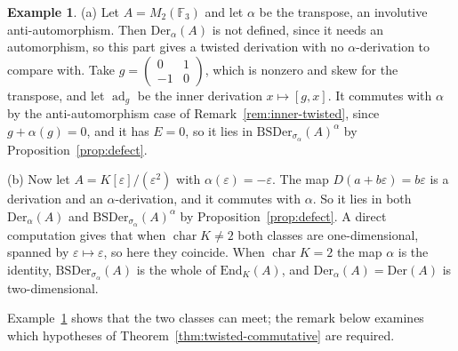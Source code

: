 \documentclass[]{interact}
\theoremstyle{plain}
\theoremstyle{definition}
\newtheorem{example}[theorem]{Example}
\theoremstyle{remark}
\newcommand{\Der}{\mathrm{Der}}
\newcommand{\BSDer}{\mathrm{BSDer}}
\newcommand{\ADer}{\mathrm{Der}_\alpha}
\begin{document}
\begin{example}\label{ex:twisted-meet}
(a) Let $A = M_2(\mathbb{F}_3)$ and let $\alpha$ be the transpose, an involutive anti-automorphism.
Then $\ADer(A)$ is not defined, since it needs an automorphism, so this part gives a twisted derivation with no $\alpha$-derivation to compare with.
Take $g = \begin{pmatrix} 0 & 1 \\ -1 & 0 \end{pmatrix}$, which is nonzero and skew for the transpose, and let $\operatorname{ad}_g$ be the inner derivation $x \mapsto [g,x]$.
It commutes with $\alpha$ by the anti-automorphism case of Remark~\ref{rem:inner-twisted}, since $g + \alpha(g) = 0$, and it has $E = 0$, so it lies in $\BSDer_{\sigma_\alpha}(A)^\alpha$ by Proposition~\ref{prop:defect}.

(b) Now let $A = K[\varepsilon]/(\varepsilon^2)$ with $\alpha(\varepsilon) = -\varepsilon$.
The map $D(a + b\varepsilon) = b\varepsilon$ is a derivation and an $\alpha$-derivation, and it commutes with $\alpha$.
So it lies in both $\ADer(A)$ and $\BSDer_{\sigma_\alpha}(A)^\alpha$ by Proposition~\ref{prop:defect}.
A direct computation gives that when $\operatorname{char} K \neq 2$ both classes are one-dimensional, spanned by $\varepsilon \mapsto \varepsilon$, so here they coincide. When $\operatorname{char} K = 2$ the map $\alpha$ is the identity, $\BSDer_{\sigma_\alpha}(A)$ is the whole of $\mathrm{End}_K(A)$, and $\ADer(A) = \Der(A)$ is two-dimensional.
\end{example}

Example~\ref{ex:twisted-meet} shows that the two classes can meet; the remark below examines which hypotheses of Theorem~\ref{thm:twisted-commutative} are required.
\end{document}

